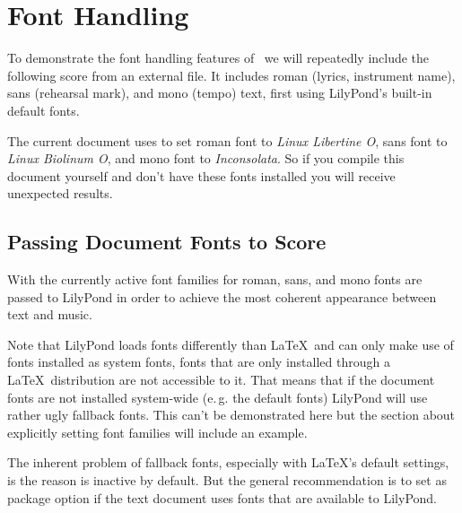 \setmainfont{Linux Libertine O}
\setsansfont[BoldFont={Linux Biolinum O Bold}]{Linux Biolinum O}
\setmonofont{Inconsolata}

\section*{Font Handling}

To demonstrate the font handling features of \lyluatex\ we will repeatedly
include the following score from an external file.  It includes roman (lyrics,
instrument name), sans (rehearsal mark), and mono (tempo) text, first using
LilyPond's built-in default fonts.


\bigskip
The current document uses  to set roman font to \emph{Linux
Libertine O}, sans font to \emph{Linux Biolinum O}, and mono font to
\emph{Inconsolata}. So if you compile this document yourself and don't have
these fonts installed you will receive unexpected results.

\subsection*{Passing Document Fonts to Score}

With  the currently active font families for roman, sans, and
mono fonts are passed to LilyPond in order to achieve the most coherent
appearance between text and music.

\bigskip


\bigskip
Note that LilyPond loads fonts differently than \LaTeX\ and can only make use of
fonts installed as system fonts, fonts that are only installed through a \LaTeX\
distribution are not accessible to it. That means that if the document fonts are
not installed system-wide (e.\,g. the default fonts) LilyPond will use rather
ugly fallback fonts. This can't be demonstrated here but the section about
explicitly setting font families will include an example.

The inherent problem of fallback fonts, especially with \LaTeX's default
settings, is the reason  is inactive by default. But the
general recommendation is to set \option{pass-fonts} as package option if the
text document uses fonts that are available to LilyPond.

